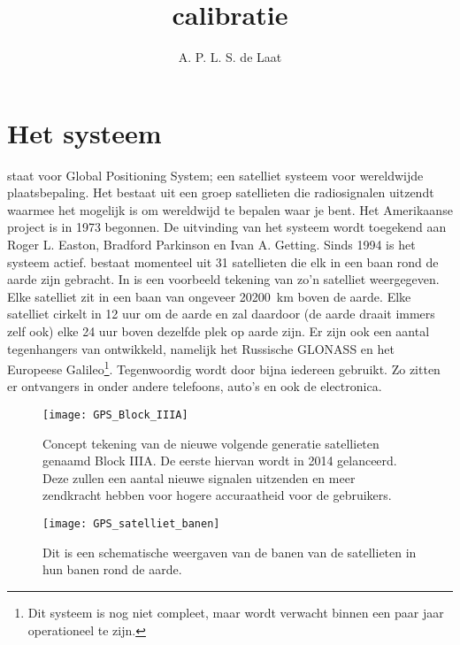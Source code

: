 



\title{\gps calibratie}
\author{A. P. L. S. de Laat}
\date{}

\maketitle

\section{Het \gps systeem}

\gps staat voor Global Positioning System; een satelliet systeem voor wereldwijde plaatsbepaling. Het bestaat uit een groep satellieten die radiosignalen uitzendt waarmee het mogelijk is om wereldwijd te bepalen
waar je bent. Het Amerikaanse project is in 1973 begonnen. De uitvinding
van het systeem wordt toegekend aan Roger L. Easton, Bradford Parkinson
en Ivan A. Getting. Sinds 1994 is het systeem actief. \gps bestaat
momenteel uit 31 satellieten die elk in een baan rond de aarde zijn gebracht.
In  is een voorbeeld tekening van zo'n \gps
satelliet weergegeven. Elke \gps satelliet zit in een baan van ongeveer
\SI{20200}{\kilo\meter} boven de aarde. Elke satelliet cirkelt in 12 uur
om de aarde en zal daardoor (de aarde draait immers zelf ook) elke 24 uur boven dezelfde plek op aarde zijn.
Er zijn ook een aantal tegenhangers van \gps ontwikkeld, namelijk het
Russische GLONASS en het Europeese Galileo\footnote{Dit systeem is nog
niet compleet, maar wordt verwacht binnen een paar jaar operationeel te
zijn.}. Tegenwoordig wordt \gps door bijna iedereen gebruikt. Zo zitten
er \gps ontvangers in onder andere telefoons, auto's en ook de \hisparc
electronica.

\begin{figure}
    \centering
    \texttt{[image: GPS\_Block\_IIIA]}
    \caption{Concept tekening van de nieuwe volgende generatie \gps
    satellieten genaamd \gps Block IIIA. De eerste hiervan wordt in 2014
    gelanceerd. Deze zullen een aantal nieuwe signalen uitzenden en meer
    zendkracht hebben voor hogere accuraatheid voor de gebruikers.}
    \label{fig:GPSBlockIIIA}
\end{figure}

\begin{figure}
    \centering
    \texttt{[image: GPS\_satelliet\_banen]}
    \caption{Dit is een schematische weergaven van de banen van de \gps
    satellieten in hun banen rond de aarde.}
    \label{fig:GPS_satelliet_banen}
\end{figure}


